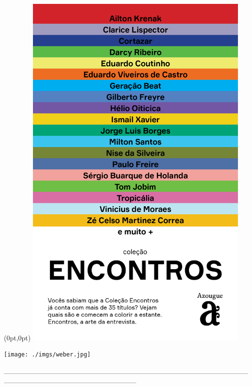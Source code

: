 \pagestyle{azougue}
\label{azougue}


\begin{textblock*}{5.625in}(0pt,0pt)%
\vspace*{-1.45cm}
\hspace*{-1.8cm}\includegraphics*[width=112mm]{./imgs/AZOUGUE.png}
\end{textblock*}

\pagebreak

\hspace{.5cm}

\begin{center}
\hspace*{-2.5cm}
\hspace*{2cm}\texttt{[image: ./imgs/weber.jpg]}
\end{center}

\hspace*{-2cm}\_\_\_\_\_\_\_\_\_\_\_\_\_\_\_\_\_\_\_\_\_\_\_\_\_\_\_\_\_\_\_\_\_\_\_\_\_\_\_\_\_\_\_\_\_\_\_\_\_\_\_\_\_\_\_\_\_\_\_\_\_\_\_\_\_\_\_\_\_\_\_\_\_\_

